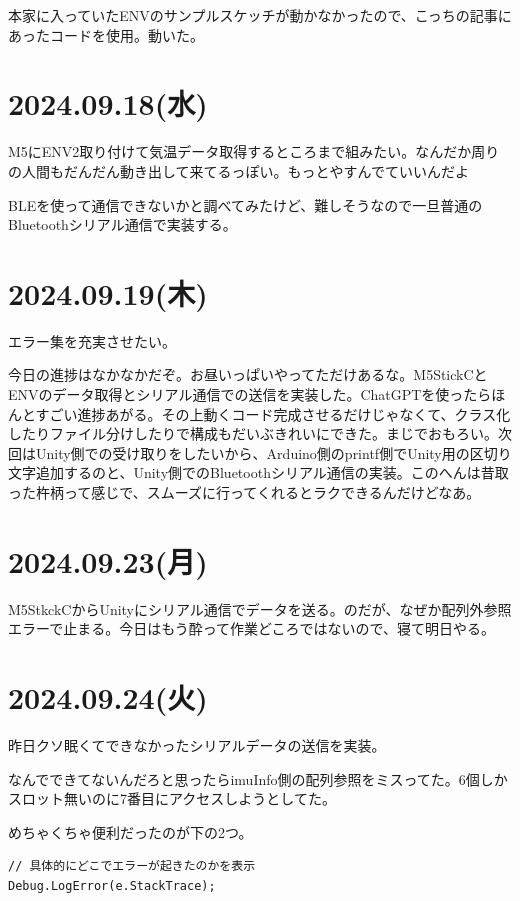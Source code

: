 \documentclass[twocolumn]{mynote}
\begin{document}
本家に入っていたENVのサンプルスケッチが動かなかったので、こっちの記事にあったコードを使用。動いた。

\section*{2024.09.18(水)}
M5にENV2取り付けて気温データ取得するところまで組みたい。なんだか周りの人間もだんだん動き出して来てるっぽい。もっとやすんでていいんだよ

BLEを使って通信できないかと調べてみたけど、難しそうなので一旦普通のBluetoothシリアル通信で実装する。

\section*{2024.09.19(木)}
エラー集を充実させたい。

今日の進捗はなかなかだぞ。お昼いっぱいやってただけあるな。M5StickCとENVのデータ取得とシリアル通信での送信を実装した。ChatGPTを使ったらほんとすごい進捗あがる。その上動くコード完成させるだけじゃなくて、クラス化したりファイル分けしたりで構成もだいぶきれいにできた。まじでおもろい。次回はUnity側での受け取りをしたいから、Arduino側のprintf側でUnity用の区切り文字追加するのと、Unity側でのBluetoothシリアル通信の実装。このへんは昔取った杵柄って感じで、スムーズに行ってくれるとラクできるんだけどなあ。

\section*{2024.09.23(月)}
M5StkckCからUnityにシリアル通信でデータを送る。のだが、なぜか配列外参照エラーで止まる。今日はもう酔って作業どころではないので、寝て明日やる。

\section*{2024.09.24(火)}
昨日クソ眠くてできなかったシリアルデータの送信を実装。

なんでできてないんだろと思ったらimuInfo側の配列参照をミスってた。6個しかスロット無いのに7番目にアクセスしようとしてた。

めちゃくちゃ便利だったのが下の2つ。

\begin{lstlisting}[caption=Unityのエラー表示,label=code:error-output]
// 具体的にどこでエラーが起きたのかを表示
Debug.LogError(e.StackTrace);
\end{lstlisting}
\end{document}
